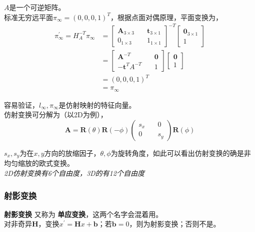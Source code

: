\documentclass[hpyerref,UTF8,a4paper,titlepage,12pt,oneside]{ctexbook}
\theoremstyle{definition}
\begin{document}
		$A$是一个可逆矩阵。\\

		标准无穷远平面$\pi_{\infty} = (0,0,0,1)^T$，根据点面对偶原理，平面变换为，
		\begin{align*}
			\pi_{\infty}^{\prime} = H_A^{-T}\pi_{\infty} 
			&=
			\begin{bmatrix}
				\mathbf{A}_{3\times 3}\quad& \mathbf{t}_{3\times 1}\\
				0_{1\times 3} \quad& 1_{1\times 1}
			\end{bmatrix}^{-T}
			\begin{bmatrix}
				\mathbf{0}_{3\times 1}\\
				1
			\end{bmatrix}\\
			&=
			\begin{bmatrix}
				\mathbf{A}^{-T}\quad& \mathbf{0}\\
				-\mathbf{t}^TA^{-T} \quad& 1
			\end{bmatrix}
			\begin{bmatrix}
				\mathbf{0}\\
				1
			\end{bmatrix}\\
			&= (0,0,0,1)^T\\
			&=\pi_{\infty} 
		\end{align*}

		容易验证，$l_{\infty}, \pi_{\infty}$是仿射映射的特征向量。\\

		仿射变换可分解为（以2D为例），
		$$
			\mathbf{A} = \mathbf{R}(\theta)\mathbf{R}(-\phi)
			\begin{pmatrix}
				s_x \quad &0\\
				0 \quad & s_y
			\end{pmatrix}
			\mathbf{R}(\phi)
		$$

		$s_x,s_y$为在$x,y$方向的放缩因子，$\theta,\phi$为旋转角度，如此可以看出仿射变换的确是非均匀缩放的欧式变换。\\

		\textit{2D仿射变换有6个自由度，3D的有12个自由度}
	
	\subsubsection{射影变换}

		\textbf{射影变换} 又称为 \textbf{单应变换}，这两个名字会混着用。\\

		对非奇异$\mathbf{H}$，变换$x^\prime = \mathbf{H}x + \mathbf{b}$；若$\mathbf{b} = 0$，则为射影变换；否则不是。\\
\end{document}
